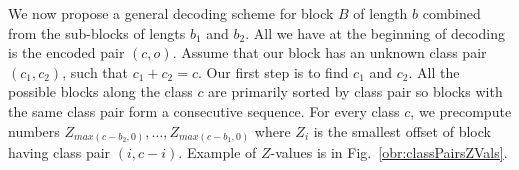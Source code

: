 


We now propose a general decoding scheme for block $B$ of length $b$ combined from the
sub-blocks of lengts $b_1$ and $b_2$. All we have at the beginning of decoding is the
encoded pair $(c, o)$. Assume that our block has an unknown class pair $(c_1, c_2)$,
such that $c_1+c_2=c$. Our first step is to find $c_1$ and $c_2$. All the possible
blocks along the class $c$ are primarily sorted by class pair so blocks with the same
class pair form a consecutive sequence. For every class $c$, we precompute numbers
$Z_{max(c-b_2, 0)},\ldots , Z_{max(c-b_1, 0)}$ where $Z_i$ is the smallest offset of
block having class pair $(i, c-i)$. Example of $Z$-values is in Fig.~\ref{obr:classPairsZVals}.

